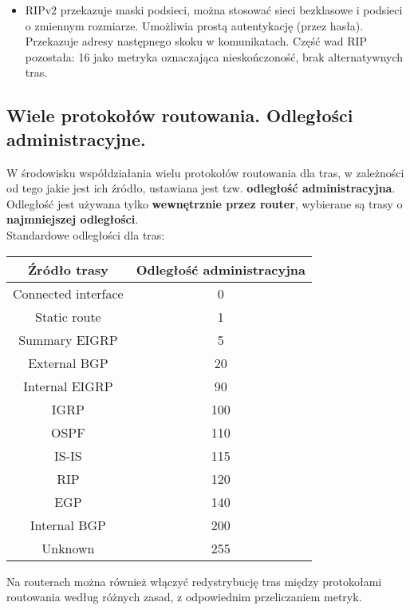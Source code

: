 \documentclass[a4paper]{article}
\begin{document}
\begin{itemize}
    \item RIPv2 przekazuje maski podsieci, można stosować sieci bezklasowe i podsieci o zmiennym rozmiarze. Umożliwia prostą autentykację (przez hasła). Przekazuje adresy następnego skoku w komunikatach. Część wad RIP pozostała: 16 jako metryka oznaczająca nieskończoność, brak alternatywnych tras.
\end{itemize}

\subsection{Wiele protokołów routowania. Odległości administracyjne.}
W środowisku współdziałania wielu protokołów routowania dla tras, w zależności od tego
jakie jest ich źródło, ustawiana jest tzw. \textbf{odległość administracyjna}. Odległość jest używana tylko \textbf{wewnętrznie przez router}, wybierane są trasy o \textbf{najmniejszej odległości}.\\

Standardowe odległości dla tras:\\
\begin{tabular}{|c|c|}
    \hline
    Źródło trasy & Odległość administracyjna\\
    \hline
    Connected interface & 0\\
    \hline
    Static route & 1\\
    \hline
    Summary EIGRP & 5\\
    \hline
    External BGP & 20\\
    \hline
    Internal EIGRP & 90\\
    \hline
    IGRP & 100\\
    \hline
    OSPF & 110\\
    \hline
    IS-IS & 115\\
    \hline
    RIP & 120\\
    \hline
    EGP & 140\\
    \hline
    Internal BGP & 200\\
    \hline
    Unknown & 255\\
    \hline
\end{tabular}

Na routerach można również włączyć redystrybucję tras między protokołami routowania
według różnych zasad, z odpowiednim przeliczaniem metryk.
\end{document}
